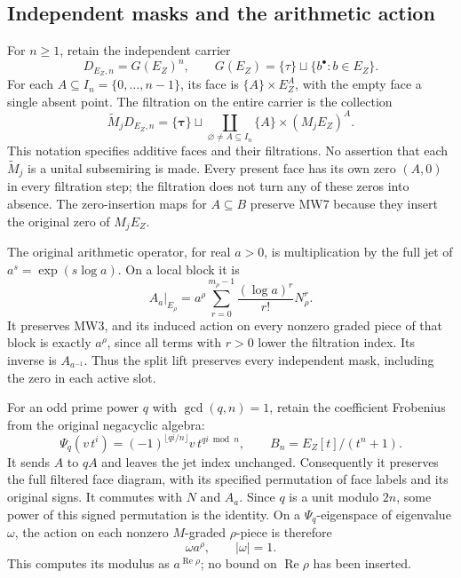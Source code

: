 \documentclass[11pt,a4paper]{article}
\begin{document}
\subsection{Independent masks and the arithmetic action}

For \(n\geq1\), retain the independent carrier
\[
 D_{E_Z,n}=G(E_Z)^n,\qquad
 G(E_Z)=\{\tau\}\sqcup\{b^\bullet:b\in E_Z\}.
 \tag{MW6}
\]
For each \(A\subseteq I_n=\{0,\ldots,n-1\}\), its face is
\(\{A\}\times E_Z^A\), with the empty face a single absent point.
The filtration on the entire carrier is the collection
\[
 \widetilde M_jD_{E_Z,n}
   =\{\boldsymbol\tau\}\sqcup
     \coprod_{\varnothing\ne A\subseteq I_n}
           \{A\}\times(M_jE_Z)^A .
 \tag{MW7}
\]
This notation specifies additive faces and their filtrations. No assertion
that each \(\widetilde M_j\) is a unital subsemiring is made.
Every present face has its own zero \((A,0)\) in every filtration step;
the filtration does not turn any of these zeros into absence.
The zero-insertion maps for \(A\subseteq B\) preserve MW7 because they
insert the original zero of \(M_jE_Z\).

The original arithmetic operator, for real \(a>0\), is multiplication by
the full jet of \(a^s=\exp(s\log a)\). On a local block it is
\[
 A_a|_{E_\rho}
 =a^\rho\sum_{r=0}^{m_\rho-1}
       \frac{(\log a)^r}{r!}N_\rho^r .
 \tag{MW8}
\]
It preserves MW3, and its induced action on every nonzero graded
piece of that block is exactly \(a^\rho\), since all terms with
\(r>0\) lower the filtration index. Its inverse is \(A_{a^{-1}}\).
Thus the split lift preserves every independent mask, including
the zero in each active slot.

For an odd prime power \(q\) with \(\gcd(q,n)=1\), retain the coefficient
Frobenius from the original negacyclic algebra:
\[
 \Psi_q(v\,t^i)
   =(-1)^{\lfloor qi/n\rfloor}v\,t^{qi\bmod n},
 \qquad B_n=E_Z[t]/(t^n+1).
 \tag{MW9}
\]
It sends \(A\) to \(qA\) and leaves the jet index unchanged.
Consequently it preserves the full filtered face diagram, with its
specified permutation of face labels and its original signs. It
commutes with \(N\) and \(A_a\). Since \(q\) is a unit modulo \(2n\),
some power of this signed permutation is the identity. On a
\(\Psi_q\)-eigenspace of eigenvalue \(\omega\), the action on each
nonzero \(M\)-graded \(\rho\)-piece is therefore
\[
       \omega a^\rho,\qquad |\omega|=1 .
 \tag{MW10}
\]
This computes its modulus as \(a^{\operatorname{Re}\rho}\); no bound
on \(\operatorname{Re}\rho\) has been inserted.
\end{document}
